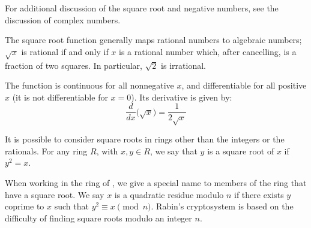\documentclass{article}
\theoremstyle{definition}
\begin{document}
For additional discussion of the square root and negative numbers, see the discussion of complex numbers.

The square root function generally maps rational numbers to algebraic numbers; $\sqrt{x}$ is rational if and only if $x$ is a rational number which, after cancelling, is a fraction of two  squares.  In particular, $\sqrt{2}$ is irrational. 

The function is continuous for all nonnegative $x$, and differentiable for all positive $x$ (it is not differentiable for $x=0$). Its derivative is given by:
\[
\frac{d}{dx}\big(\sqrt{x}\big)=\frac{1}{2\sqrt{x}}
\]

It is possible to consider square roots in rings other than the integers or the rationals. For any ring $R$, with $x,y\in R$, we say that $y$ is a square root of $x$ if $y^2=x$. 

When working in the ring of , we give a special name to members of the ring that have a square root. We say $x$ is a quadratic residue modulo $n$ if there exists $y$ coprime to $x$ such that $y^2\equiv x\pmod{n}$. Rabin's cryptosystem is based on the difficulty of finding square roots modulo an integer $n$.
\end{document}
